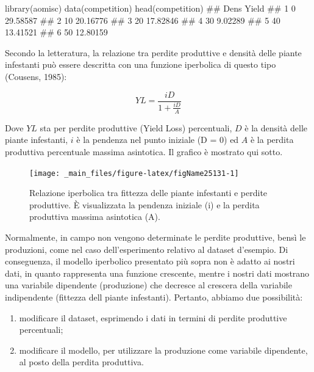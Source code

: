 \documentclass[a4paper,12pt,oneside]{book}
\providecommand{\tightlist}{%
  \setlength{\itemsep}{0pt}\setlength{\parskip}{0pt}}
\newenvironment{Shaded}{}{}
\newcommand{\KeywordTok}[1]{#1}
\newcommand{\CommentTok}[1]{#1}
\newcommand{\NormalTok}[1]{#1}
\begin{document}
\begin{Shaded}
\begin{Highlighting}[]
\KeywordTok{library}\NormalTok{(aomisc)}
\KeywordTok{data}\NormalTok{(competition)}
\KeywordTok{head}\NormalTok{(competition)}
\CommentTok{##   Dens    Yield}
\CommentTok{## 1    0 29.58587}
\CommentTok{## 2   10 20.16776}
\CommentTok{## 3   20 17.82846}
\CommentTok{## 4   30  9.02289}
\CommentTok{## 5   40 13.41521}
\CommentTok{## 6   50 12.80159}
\end{Highlighting}
\end{Shaded}

Secondo la letteratura, la relazione tra perdite produttive e densità delle piante infestanti può essere descritta con una funzione iperbolica di questo tipo (Cousens, 1985):

\[YL = \frac{iD}{1 + \frac{iD}{A}}\]

Dove \(YL\) sta per perdite produttive (Yield Loss) percentuali, \(D\) è la densità delle piante infestanti, \(i\) è la pendenza nel punto iniziale (D = 0) ed \(A\) è la perdita produttiva percentuale massima asintotica. Il grafico è mostrato qui sotto.

\begin{figure}

{\centering \texttt{[image: \_main\_files/figure-latex/figName25131-1]} 

}

\caption{Relazione iperbolica tra fittezza delle piante infestanti e perdite produttive. È  visualizzata la pendenza iniziale (i) e la perdita produttiva massima asintotica (A).}\label{fig:figName25131}
\end{figure}

Normalmente, in campo non vengono determinate le perdite produttive, bensì le produzioni, come nel caso dell'esperimento relativo al dataset d'esempio. Di conseguenza, il modello iperbolico presentato più sopra non è adatto ai nostri dati, in quanto rappresenta una funzione crescente, mentre i nostri dati mostrano una variabile dipendente (produzione) che decresce al crescera della variabile indipendente (fittezza dell piante infestanti). Pertanto, abbiamo due possibilità:

\begin{enumerate}
\def\labelenumi{\arabic{enumi}.}
\tightlist
\item
  modificare il dataset, esprimendo i dati in termini di perdite produttive percentuali;
\item
  modificare il modello, per utilizzare la produzione come variabile dipendente, al posto della perdita produttiva.
\end{enumerate}
\end{document}
